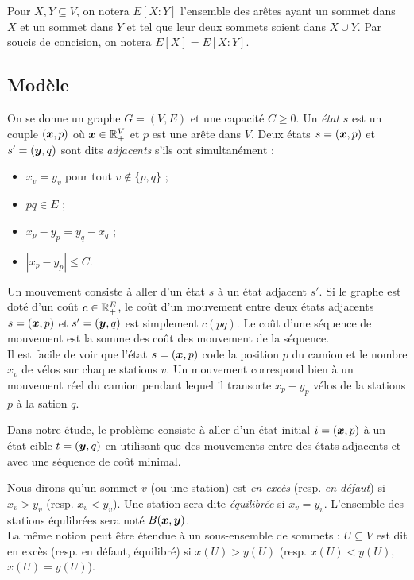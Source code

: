 Pour $X,Y \subseteq V$, on notera $E[X:Y]$ l'ensemble des arêtes ayant un sommet dans $X$ et un sommet dans $Y$ et tel que leur deux sommets soient dans $X \cup Y$. Par soucis de concision, on notera $E[X] = E[X:Y]$.

\subsection{Modèle}

On se donne un graphe $G=(V,E)$ et une capacité $C \ge 0$. Un \emph{état} $s$ est un couple $(\boldsymbol{x},p)$ où $\boldsymbol{x} \in \mathbb{R}^V_+$ et $p$ est une arête dans $V$. Deux états $s=(\boldsymbol{x},p)$ et $s'=(\boldsymbol{y},q)$ sont dits \emph{adjacents} s'ils ont simultanément :
\begin{itemize}
\item $x_v=y_v$ pour tout $v \notin \{p,q\}$ ;
\item $pq \in E$ ;
\item $x_p-y_p = y_q-x_q$ ;
\item $\left| x_p-y_p \right| \le C$.
\end{itemize}

Un mouvement consiste à aller d'un état $s$ à un état adjacent $s'$. Si le graphe est doté d'un coût $\boldsymbol{c} \in \mathbb{R}^E_+$, le coût d'un mouvement entre deux états adjacents $s=(\boldsymbol{x},p)$ et $s'=(\boldsymbol{y},q)$ est simplement $c(pq)$. Le coût d'une séquence de mouvement est la somme des coût des mouvement de la séquence.
\\

Il est facile de voir que l'état $s=(\boldsymbol{x},p)$ code la position $p$ du camion et le nombre $x_v$ de vélos sur chaque stations $v$. Un mouvement correspond bien à un mouvement réel du camion pendant lequel il transorte $x_p-y_p$ vélos de la stations $p$ à la sation $q$.

Dans notre étude, le problème consiste à aller d'un état initial $i=(\boldsymbol{x},p)$ à un état cible $t=(\boldsymbol{y},q)$ en utilisant que des mouvements entre des états adjacents et avec une séquence de coût minimal.

Nous dirons qu'un sommet $v$ (ou une station) est \emph{en excès} (resp. \emph{en défaut}) si $x_v > y_v$ (resp. $x_v < y_v$). Une station sera dite \emph{équilibrée} si $x_v=y_v$. L'ensemble des stations équlibrées sera noté $B(\boldsymbol{x},\boldsymbol{y})$.
\\
La même notion peut être étendue à un sous-ensemble de sommets : $U \subseteq V$ est dit en excès (resp. en défaut, équilibré) si $x(U) > y(U)$ (resp. $x(U) < y(U)$, $x(U) = y(U)$).

